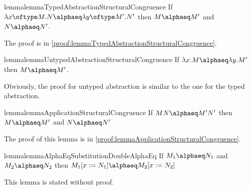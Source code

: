 \begin{reusable}{lemma}{lemmaTypedAbstractionStructuralCongruence}
If $\lambda x \oftype M.N \alphaeq \lambda y \oftype M'.N'$ then $M \alphaeq M'$ and $N \alphaeq N'$.
\end{reusable}
The proof is in \cref{proof:lemmaTypedAbstractionStructuralCongruence}.

\begin{reusable}{lemma}{lemmaUntypedAbstractionStructuralCongruence}
If $\lambda x.M \alphaeq \lambda y.M'$ then $M \alphaeq M'$.
\end{reusable}
Obviously, the proof for untyped abstraction is similar to the one for the typed abstraction.

\begin{reusable}{lemma}{lemmaApplicationStructuralCongruence}
If $MN \alphaeq M'N'$ then $M \alphaeq M'$ and $N \alphaeq N'$
\end{reusable}
The proof of this lemma is in \cref{proof:lemmaApplicationStructuralCongruence}.

\begin{reusable}{lemma}{lemmaAlphaEqSubstitutionDoubleAlphaEq}
If $M_1 \alphaeq N_1$ and $M_2 \alphaeq N_2$ then $M_1[x := N_1] \alphaeq M_2[x := N_2]$
\end{reusable}

This lemma is stated without proof.
